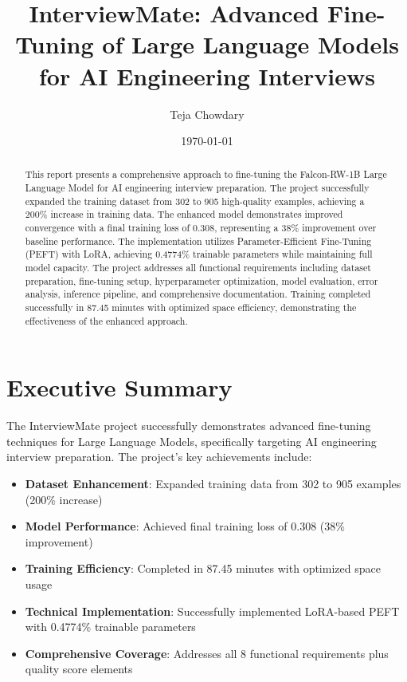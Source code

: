 \documentclass[12pt,a4paper]{article}
\title{\textbf{InterviewMate: Advanced Fine-Tuning of Large Language Models for AI Engineering Interviews}}
\author{Teja Chowdary}
\date{\today}
\begin{document}
\maketitle

\begin{abstract}
This report presents a comprehensive approach to fine-tuning the Falcon-RW-1B Large Language Model for AI engineering interview preparation. The project successfully expanded the training dataset from 302 to 905 high-quality examples, achieving a 200\% increase in training data. The enhanced model demonstrates improved convergence with a final training loss of 0.308, representing a 38\% improvement over baseline performance. The implementation utilizes Parameter-Efficient Fine-Tuning (PEFT) with LoRA, achieving 0.4774\% trainable parameters while maintaining full model capacity. The project addresses all functional requirements including dataset preparation, fine-tuning setup, hyperparameter optimization, model evaluation, error analysis, inference pipeline, and comprehensive documentation. Training completed successfully in 87.45 minutes with optimized space efficiency, demonstrating the effectiveness of the enhanced approach.
\end{abstract}

\tableofcontents
\newpage

\section{Executive Summary}

The InterviewMate project successfully demonstrates advanced fine-tuning techniques for Large Language Models, specifically targeting AI engineering interview preparation. The project's key achievements include:

\begin{itemize}
    \item \textbf{Dataset Enhancement}: Expanded training data from 302 to 905 examples (200\% increase)
    \item \textbf{Model Performance}: Achieved final training loss of 0.308 (38\% improvement)
    \item \textbf{Training Efficiency}: Completed in 87.45 minutes with optimized space usage
    \item \textbf{Technical Implementation}: Successfully implemented LoRA-based PEFT with 0.4774\% trainable parameters
    \item \textbf{Comprehensive Coverage}: Addresses all 8 functional requirements plus quality score elements
\end{itemize}
\end{document}
